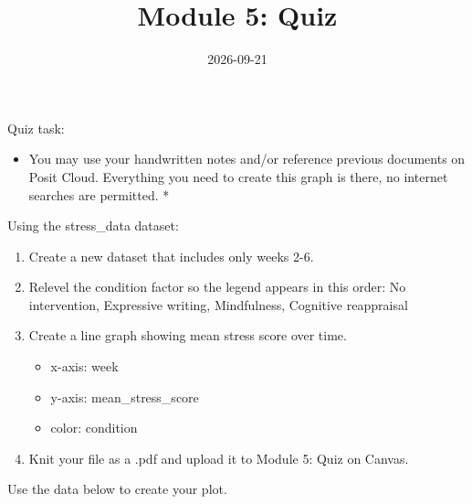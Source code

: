 \documentclass[
]{article}
\title{Module 5: Quiz}
\author{}
\date{\vspace{-2.5em}2026-09-21}
\providecommand{\tightlist}{%
  \setlength{\itemsep}{0pt}\setlength{\parskip}{0pt}}
\begin{document}
\maketitle

Quiz task:

\begin{itemize}
\tightlist
\item
  You may use your handwritten notes and/or reference previous documents
  on Posit Cloud. Everything you need to create this graph is there, no
  internet searches are permitted. *
\end{itemize}

Using the stress\_data dataset:

\begin{enumerate}
\def\labelenumi{\arabic{enumi}.}
\tightlist
\item
  Create a new dataset that includes only weeks 2-6.
\item
  Relevel the condition factor so the legend appears in this order: No
  intervention, Expressive writing, Mindfulness, Cognitive reappraisal
\item
  Create a line graph showing mean stress score over time.

  \begin{itemize}
  \tightlist
  \item
    x-axis: week
  \item
    y-axis: mean\_stress\_score
  \item
    color: condition
  \end{itemize}
\item
  Knit your file as a .pdf and upload it to Module 5: Quiz on Canvas.
\end{enumerate}

Use the data below to create your plot.
\end{document}
